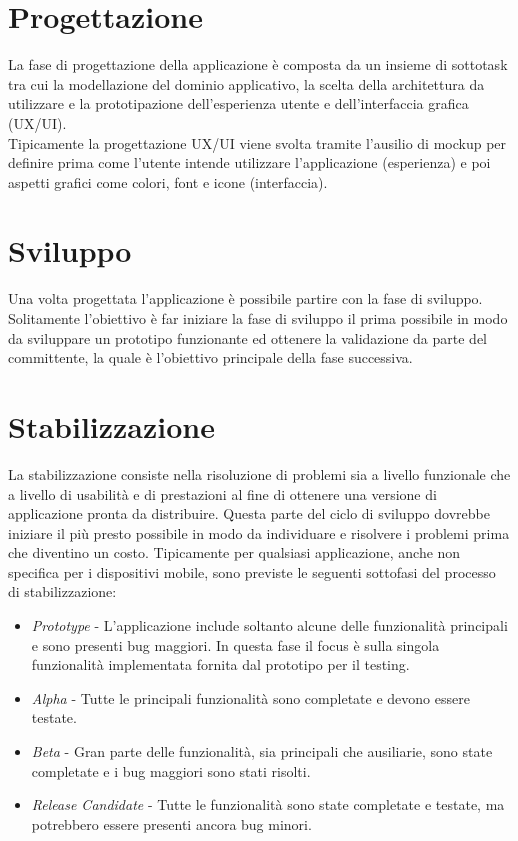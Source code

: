 \section{Progettazione}
La fase di progettazione della applicazione è composta da un insieme di sottotask tra cui la modellazione del dominio applicativo, la scelta della architettura da utilizzare e la prototipazione dell'esperienza utente e dell'interfaccia grafica (UX/UI).\\
Tipicamente la progettazione UX/UI viene svolta tramite l'ausilio di mockup per definire prima come l'utente intende utilizzare l'applicazione (esperienza) e poi aspetti grafici come colori, font e icone (interfaccia).

\section{Sviluppo}
Una volta progettata l'applicazione è possibile partire con la fase di sviluppo. Solitamente l'obiettivo è far iniziare la fase di sviluppo il prima possibile in modo da sviluppare un prototipo funzionante ed ottenere la validazione da parte del committente, la quale è l'obiettivo principale della fase successiva.

\section{Stabilizzazione}
La stabilizzazione consiste nella risoluzione di problemi sia a livello funzionale che a livello di usabilità e di prestazioni al fine di ottenere una versione di applicazione pronta da distribuire. Questa parte del ciclo di sviluppo dovrebbe iniziare il più presto possibile in modo da individuare e risolvere i problemi prima che diventino un costo. Tipicamente per qualsiasi applicazione, anche non specifica per i dispositivi mobile, sono previste le seguenti sottofasi del processo di stabilizzazione\cite{sdlf}:
\begin{itemize}
    \item \textit{Prototype} - L'applicazione include soltanto alcune delle funzionalità principali e sono presenti bug maggiori. In questa fase il focus è sulla singola funzionalità implementata fornita dal prototipo per il testing.
    \item \textit{Alpha} - Tutte le principali funzionalità sono completate e devono essere testate.
    \item \textit{Beta} - Gran parte delle funzionalità, sia principali che ausiliarie, sono state completate e i bug maggiori sono stati risolti.
    \item \textit{Release Candidate} - Tutte le funzionalità sono state completate e testate, ma potrebbero essere presenti ancora bug minori.
\end{itemize}

